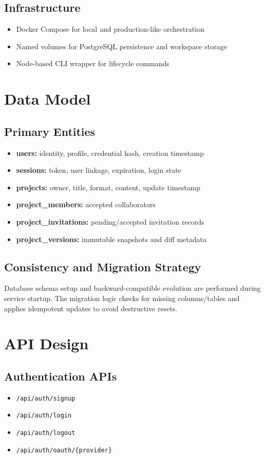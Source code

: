 \documentclass[11pt,a4paper]{article}
\begin{document}
\subsection{Infrastructure}
\begin{itemize}[leftmargin=1.5em]
  \item Docker Compose for local and production-like orchestration
  \item Named volumes for PostgreSQL persistence and workspace storage
  \item Node-based CLI wrapper for lifecycle commands
\end{itemize}

\section{Data Model}
\subsection{Primary Entities}
\begin{itemize}[leftmargin=1.5em]
  \item \textbf{users:} identity, profile, credential hash, creation timestamp
  \item \textbf{sessions:} token, user linkage, expiration, login state
  \item \textbf{projects:} owner, title, format, content, update timestamp
  \item \textbf{project\_members:} accepted collaborators
  \item \textbf{project\_invitations:} pending/accepted invitation records
  \item \textbf{project\_versions:} immutable snapshots and diff metadata
\end{itemize}

\subsection{Consistency and Migration Strategy}
Database schema setup and backward-compatible evolution are performed during service startup. The migration logic checks for missing columns/tables and applies idempotent updates to avoid destructive resets.

\section{API Design}
\subsection{Authentication APIs}
\begin{itemize}[leftmargin=1.5em]
  \item \texttt{/api/auth/signup}
  \item \texttt{/api/auth/login}
  \item \texttt{/api/auth/logout}
  \item \texttt{/api/auth/oauth/\{provider\}}
\end{itemize}
\end{document}
